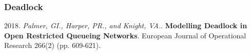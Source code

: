 \documentclass[xcolor={table}]{beamer}
\begin{document}
\begin{frame}
\frametitle{Deadlock}
\begin{center}

\end{center}
\scriptsize{\textcolor{textorange}{2018. \textit{Palmer, GI., Harper, PR., and Knight, VA.}. \textbf{Modelling Deadlock in Open Restricted Queueing Networks}. European Journal of Operational Research 266(2) (pp. 609-621).}}
\end{frame}

\begin{frame}
\begin{center}
\centering

\end{center}
\end{frame}

\begin{frame}
\begin{center}

\end{center}
\end{frame}

\begin{frame}
\centering

\end{frame}
\end{document}
